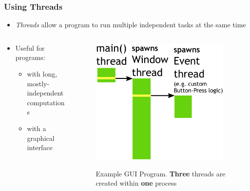 \documentclass{beamer}
\newcommand{\linespace}{\vskip 0.25cm}
\begin{document}
\begin{frame}
\frametitle{Using Threads}

\begin{itemize}
	\item \emph{Threads} allow a program to run multiple independent tasks at the same time
\end{itemize}


\begin{columns}
	\begin{column}{0.5\textwidth}
		\begin{itemize}
		
		\linespace
		
		\item Useful for programs:
			\begin{itemize}
  			 \item with long, mostly-independent computations
			 \item with a graphical interface
	  		\end{itemize}
		\end{itemize}
	\end{column}
	
	\begin{column}{0.5\textwidth}
		\begin{figure}
		\includegraphics[width=0.95\textwidth]{Illustrations/ThreadExample_GUI_Part2}
		\label{fig:domains}
		\caption{Example GUI Program. \textbf{Three} threads are created within \textbf{one} process}
		\end{figure}
	\end{column}
\end{columns}

\end{frame}
\end{document}
